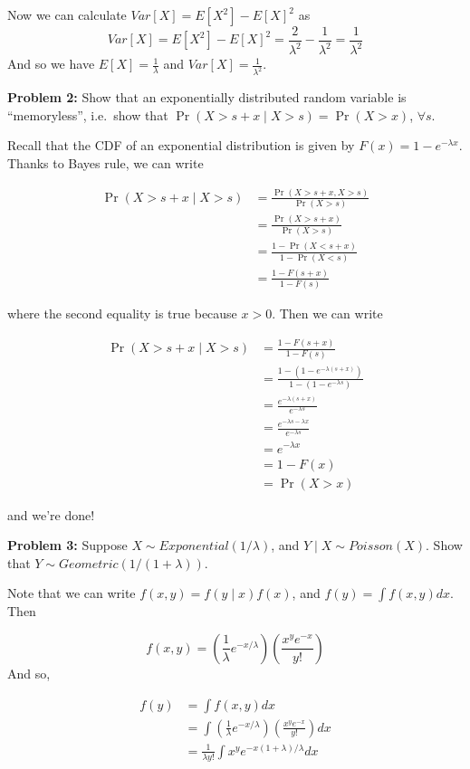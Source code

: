 \documentclass[
  letterpaper,
  DIV=11,
  numbers=noendperiod]{scrreprt}
\begin{document}
Now we can calculate \(Var[X] = E[X^2] - E[X]^2\) as \[
Var[X] = E[X^2] - E[X]^2 = \frac{2}{\lambda^2} - \frac{1}{\lambda^2} = \frac{1}{\lambda^2}
\] And so we have \(E[X] = \frac{1}{\lambda}\) and
\(Var[X] = \frac{1}{\lambda^2}\).

\textbf{Problem 2:} Show that an exponentially distributed random
variable is ``memoryless'', i.e.~show that
\(\Pr(X > s + x \mid X > s) = \Pr(X > x)\), \(\forall s\).

Recall that the CDF of an exponential distribution is given by
\(F(x) = 1-e^{-\lambda x}\). Thanks to Bayes rule, we can write

\begin{align*}
    \Pr(X > s + x \mid X > s) & = \frac{\Pr(X > s + x , X > s)}{\Pr(X > s)} \\
    & = \frac{\Pr(X > s + x)}{\Pr(X > s)} \\
    & = \frac{1 - \Pr(X < s + x)}{1 - \Pr(X < s)} \\
    & = \frac{1 - F(s + x)}{1 - F(s)}
\end{align*}

where the second equality is true because \(x > 0\). Then we can write

\begin{align*}
    \Pr(X > s + x \mid X > s) & = \frac{1 - F(s + x)}{1 - F(s)} \\
    & = \frac{1 - \left(1 - e^{-\lambda(s + x)}\right)}{1 - \left(1 - e^{-\lambda s}\right)} \\
    & = \frac{e^{-\lambda(s + x)}}{e^{-\lambda s}} \\
    & = \frac{e^{-\lambda s - \lambda x}}{e^{-\lambda s}} \\
    & = e^{-\lambda x} \\
    & = 1 - F(x) \\
    & = \Pr(X > x)
\end{align*}

and we're done!

\textbf{Problem 3:} Suppose \(X \sim Exponential(1/\lambda)\), and
\(Y \mid X \sim Poisson(X)\). Show that
\(Y \sim Geometric(1/(1 + \lambda))\).

Note that we can write \(f(x, y) = f(y \mid x) f(x)\), and
\(f(y) = \int f(x, y) dx\). Then

\[
f(x, y) = \left( \frac{1}{\lambda} e^{-x/\lambda} \right) \left( \frac{x^y e^{-x}}{y!} \right)
\] And so,

\begin{align*}
    f(y) & = \int f(x, y) dx \\
    & = \int \left( \frac{1}{\lambda} e^{-x/\lambda} \right) \left( \frac{x^y e^{-x}}{y!} \right) dx \\
    & = \frac{1}{\lambda y!} \int x^y e^{-x(1 + \lambda)/\lambda} dx
\end{align*}
\end{document}
